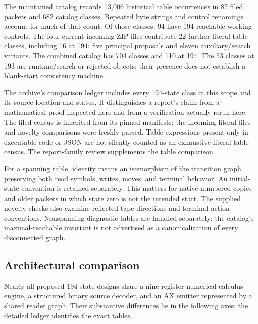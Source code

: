 \documentclass[11pt,letterpaper]{article}
\begin{document}
The maintained catalog records 13,006 historical table occurrences in 82
filed packets and 682 catalog classes. Repeated byte strings and control
renamings account for much of that count. Of those classes, 94 have 194
reachable working controls. The four current incoming ZIP files contribute
22 further literal-table classes, including 16 at 194: five principal
proposals and eleven auxiliary/search variants. The combined catalog has
704 classes and 110 at 194. The 53 classes at 193 are runtime/search or
rejected objects; their presence does not establish a blank-start
consistency machine.

The archive's comparison ledger includes every 194-state class in this
scope and its source location and status. It distinguishes a report's
claim from a mathematical proof inspected here and from a verification
actually rerun here. The filed census is inherited from its pinned
manifests; the incoming literal files and novelty comparisons were freshly
parsed. Table expressions present only in executable code or JSON are not
silently counted as an exhaustive literal-table census. The report-family
review supplements the table comparison.

For a spanning table, identity means an isomorphism of the transition
graph preserving both read symbols, writes, moves, and terminal behavior.
An initial-state convention is retained separately. This matters for
native-numbered copies and older packets in which state zero is not the
intended start. The supplied novelty checks also examine reflected tape
directions and terminal-action conventions. Nonspanning diagnostic tables
are handled separately: the catalog's maximal-reachable invariant is not
advertised as a canonicalization of every disconnected graph.

\subsection{Architectural comparison}

Nearly all proposed 194-state designs share a nine-register numerical
calculus engine, a structured binary source decoder, and an AX emitter
represented by a shared reader graph. Their substantive differences lie
in the following axes; the detailed ledger identifies the exact tables.
\end{document}
